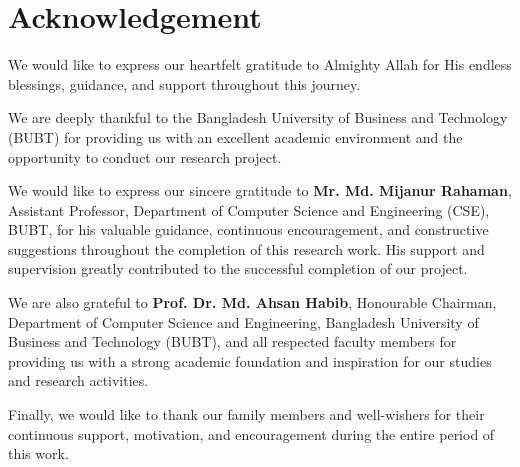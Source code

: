 \chapter*{Acknowledgement}

We would like to express our heartfelt gratitude to Almighty Allah for His endless blessings, guidance, and support throughout this journey.

We are deeply thankful to the Bangladesh University of Business and Technology (BUBT) for providing us with an excellent academic environment and the opportunity to conduct our research project.

We would like to express our sincere gratitude to \textbf{Mr. Md. Mijanur Rahaman}, Assistant Professor, Department of Computer Science and Engineering (CSE), BUBT, for his valuable guidance, continuous encouragement, and constructive suggestions throughout the completion of this research work. His support and supervision greatly contributed to the successful completion of our project.

We are also grateful to \textbf{Prof. Dr. Md. Ahsan Habib}, Honourable Chairman, Department of Computer Science and Engineering, Bangladesh University of Business and Technology (BUBT), and all respected faculty members for providing us with a strong academic foundation and inspiration for our studies and research activities.

Finally, we would like to thank our family members and well-wishers for their continuous support, motivation, and encouragement during the entire period of this work.